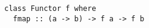 \begin{algorithm}

\begin{verbatim}
class Functor f where
  fmap :: (a -> b) -> f a -> f b
\end{verbatim}

\caption{Functor type class in Haskell %
\label{functor:haskell}}
\end{algorithm}
